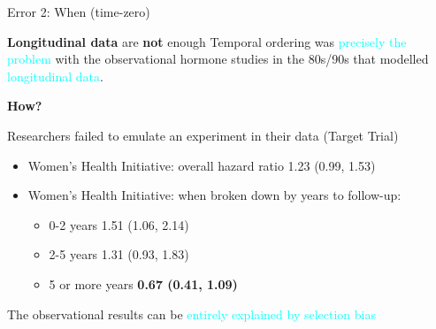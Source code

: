 \documentclass[
  ignorenonframetext,
  aspectratio=169,
]{beamer}
\providecommand{\tightlist}{%
  \setlength{\itemsep}{0pt}\setlength{\parskip}{0pt}}
\begin{document}
\begin{frame}{Error 2: When (time-zero)}
\label{error-2-when-time-zero}
\begin{block}{\textbf{Longitudinal data} are \textbf{not} enough}
\label{longitudinal-data-are-not-enough}
Temporal ordering was \textcolor{cyan}{precisely the problem} with the
observational hormone studies in the 80s/90s that modelled
\textcolor{cyan}{longitudinal data}.

\textbf{How?}
\end{block}

\begin{block}{Researchers failed to emulate an experiment in their data
(Target Trial)}
\label{researchers-failed-to-emulate-an-experiment-in-their-data-target-trial}
\begin{itemize}
\item
  Women's Health Initiative: overall hazard ratio 1.23 (0.99, 1.53)
\item
  Women's Health Initiative: when broken down by years to follow-up:

  \begin{itemize}
  \tightlist
  \item
    0-2 years 1.51 (1.06, 2.14)
  \item
    2-5 years 1.31 (0.93, 1.83)
  \item
    5 or more years \textbf{0.67 (0.41, 1.09)}
  \end{itemize}
\end{itemize}

\begin{tcolorbox}[enhanced jigsaw, coltitle=black, left=2mm, colback=white, rightrule=.15mm, colframe=quarto-callout-note-color-frame, opacitybacktitle=0.6, arc=.35mm, colbacktitle=quarto-callout-note-color!10!white, toprule=.15mm, bottomtitle=1mm, breakable, toptitle=1mm, opacityback=0, titlerule=0mm, title={Survivor Bias.}, bottomrule=.15mm, leftrule=.75mm]

The observational results can be
\textcolor{cyan}{entirely explained by selection bias}

\end{tcolorbox}

\begin{tcolorbox}[enhanced jigsaw, coltitle=black, left=2mm, colback=white, rightrule=.15mm, colframe=quarto-callout-note-color-frame, opacitybacktitle=0.6, arc=.35mm, colbacktitle=quarto-callout-note-color!10!white, toprule=.15mm, bottomtitle=1mm, breakable, toptitle=1mm, opacityback=0, titlerule=0mm, title={Emulating a target trial with observational data recovers experimental
effects.}, bottomrule=.15mm, leftrule=.75mm]


\end{tcolorbox}
\end{block}
\end{frame}
\end{document}
